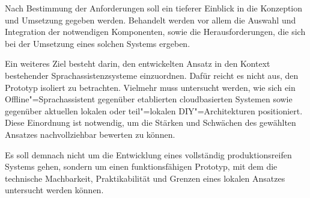 Nach Bestimmung der Anforderungen soll ein tieferer Einblick in die Konzeption und Umsetzung gegeben werden. Behandelt werden vor allem die Auswahl und Integration der notwendigen Komponenten, sowie die Herausforderungen, die sich bei der Umsetzung eines solchen Systems ergeben.

Ein weiteres Ziel besteht darin, den entwickelten Ansatz in den Kontext bestehender Sprachassistenzsysteme einzuordnen. Dafür reicht es nicht aus, den Prototyp isoliert zu betrachten. Vielmehr muss untersucht werden, wie sich ein Offline"=Sprachassistent gegenüber etablierten cloudbasierten Systemen sowie gegenüber aktuellen lokalen oder teil"=lokalen DIY"=Architekturen positioniert. Diese Einordnung ist notwendig, um die Stärken und Schwächen des gewählten Ansatzes nachvollziehbar bewerten zu können.

Es soll demnach nicht um die Entwicklung eines vollständig produktionsreifen Systems gehen, sondern um einen funktionsfähigen Prototyp, mit dem die technische Machbarkeit, Praktikabilität und Grenzen eines lokalen Ansatzes untersucht werden können.

